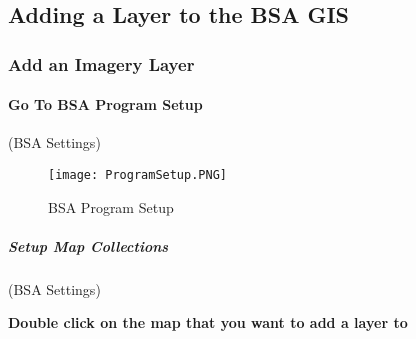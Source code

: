 \documentclass[class=article , crop=false, titlepage, twoside, multi={itemize, figure, verbatim}, float=false]{standalone}
\title{}  %
\begin{document}

\ifstandalone
\maketitle %
\clearpage
\fi

\subsection{Adding a Layer to the BSA GIS}

\subsubsection{Add an Imagery Layer}
\vspace{.25in}

%
%
\paragraph[BSA Program Setup ]{\Large Go To BSA Program Setup\texorpdfstring{\\}{}}
(BSA Settings)
\vspace{.25in}

\vspace{.25in}

%
%
\begin{figure}[h!]
\centering
    \texttt{[image: ProgramSetup.PNG]}
\caption{BSA Program Setup}
\end{figure}
\clearpage
%
%
%
\subparagraph[Setup Map Collections]{\Large Setup Map Collections\texorpdfstring{\\}{}}
(BSA Settings)
\vspace{.5in}

\vspace{.5in}

\noindent \textbf{Double click on the map that you want to add a layer to}
\vspace{.5in}
\end{document}

